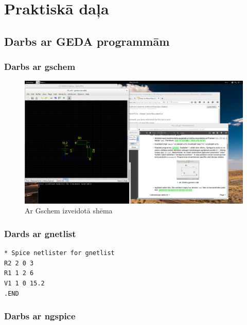 \documentclass{report}
\begin{document}
\chapter{Praktiskā daļa}
\section{Darbs ar GEDA programmām}
\subsection{Darbs ar gschem}

\begin{figure}[!b]
\includegraphics[width=14cm]{bildes/01.png}
\caption{Ar Gschem izveidotā shēma}
\label{1}
\end{figure}
\newpage
\subsection{Dards ar gnetlist}
\begin{verbatim}
* Spice netlister for gnetlist
R2 2 0 3
R1 1 2 6
V1 1 0 15.2
.END
\end{verbatim}

\subsection{Darbs ar ngspice}
\end{document}

